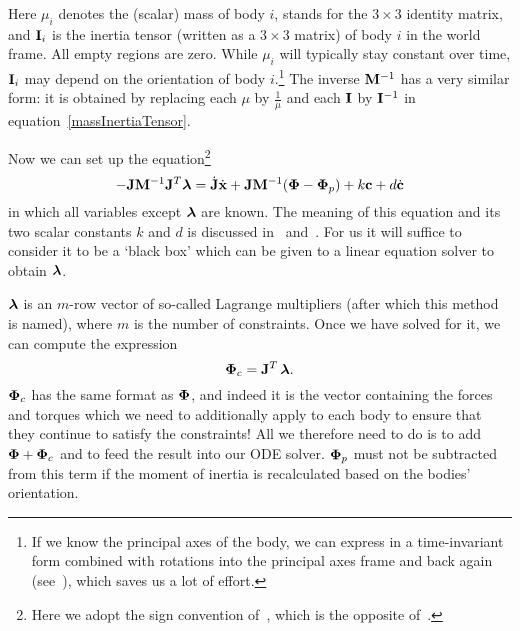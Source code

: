 Here $\mu_i$ denotes the (scalar) mass of body $i$,  stands for the $3\times3$
identity matrix, and $\m{I}_i$ is the inertia tensor (written as a $3\times3$ matrix)
of body $i$ in the world frame. All empty regions are zero. While $\mu_i$ will typically
stay constant over time, $\m{I}_i$ may depend on the orientation of body $i$.\footnote{If
we know the principal axes of the body, we can express  in a time-invariant
form combined with rotations into the principal axes frame and back again
(see~\cite{BaraffWitkin:97}), which saves us a lot of effort.} The inverse $\m{M}^{-1}$
has a very similar form: it is obtained by replacing each $\mu$ by $\frac{1}{\mu}$ and
each $\m{I}$ by $\m{I}^{-1}$ in equation~\ref{massInertiaTensor}.

Now we can set up the equation\footnote{Here we adopt the sign convention
of~\cite{BaraffWitkin:97}, which is the opposite of~\cite{Saunders:PhD}.}
\begin{equation}
\label{lagrangeEquation}
-\m{J}\m{M}^{-1}\m{J}^T\ve{\lambda} = \dot{\m{J}}\dot{\ve{x}} +
    \m{J}\m{M}^{-1}(\ve{\Phi} - \ve{\Phi}_p) + k\ve{c} + d\dot{\ve{c}}
\end{equation}
in which all variables except $\ve{\lambda}$ are known. The meaning of this equation and
its two scalar constants $k$ and $d$ is discussed in~\cite{BaraffWitkin:97}
and~\cite{Saunders:PhD}. For us it will suffice to consider it to be a `black box' which can be
given to a linear equation solver to obtain $\ve{\lambda}$.

$\ve{\lambda}$ is an $m$-row vector of so-called Lagrange multipliers (after which this method
is named), where $m$ is the number of constraints. Once we have solved for it, we can compute
the expression
\begin{equation}
\ve{\Phi}_c = \m{J}^T\,\ve{\lambda}.
\end{equation}
$\ve{\Phi}_c$ has the same format as $\ve{\Phi}$, and indeed it is the vector containing
the forces and torques which we need to additionally apply to each body to ensure that they
continue to satisfy the constraints! All we therefore need to do is to add
$\ve{\Phi} + \ve{\Phi}_c$ and to feed the result into our ODE solver. $\ve{\Phi}_p$ must not
be subtracted from this term if the moment of inertia is recalculated based on the bodies'
orientation.
